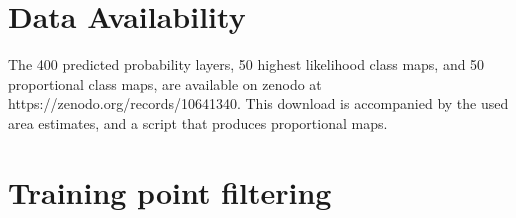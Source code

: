 \section{Data Availability}
The 400 predicted probability layers, 50 highest likelihood class maps, and 50 proportional class maps, are available on zenodo at https://zenodo.org/records/10641340. This download is accompanied by the used area estimates, and a script that produces proportional maps.



%  



\appendix

\section{Training point filtering}
\label{tab:corine_filtering}
